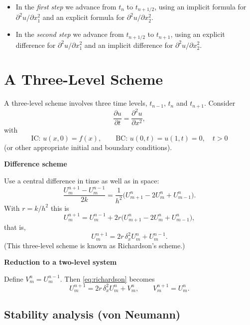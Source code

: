 \documentclass[11pt,a4paper]{article}
\numberwithin{equation}{section}
\theoremstyle{spacedplain}
\theoremstyle{spaceddefinition}
\theoremstyle{spacedremark}
\newcommand{\step}[1]{\par\addvspace{0.6em}\noindent\textbf{#1}\par\nobreak}
\newcommand{\pd}[2]{\frac{\partial #1}{\partial #2}}
\newcommand{\pdd}[2]{\frac{\partial^2 #1}{\partial #2^2}}
\begin{document}
\begin{itemize}
  \item In the \emph{first step} we advance from \(t_n\) to
    \(t_{n+1/2}\), using an implicit formula for
    \(\partial^2u/\partial x_1^2\) and an explicit formula for
    \(\partial^2u/\partial x_2^2\).
  \item In the \emph{second step} we advance from \(t_{n+1/2}\) to
    \(t_{n+1}\), using an explicit difference for
    \(\partial^2u/\partial x_1^2\) and an implicit difference for
    \(\partial^2u/\partial x_2^2\).
\end{itemize}

\section{A Three-Level Scheme}

A three-level scheme involves three time levels, \(t_{n-1}\), \(t_n\)
and \(t_{n+1}\).  Consider
\[
  \pd ut=\pdd ux,
\]
with
\[
  \text{IC: } u(x,0)=f(x),
  \qquad
  \text{BC: } u(0,t)=u(1,t)=0,\quad t>0
\]
(or other appropriate initial and boundary conditions).

\step{Difference scheme}
Use a central difference in time as well as in space:
\[
  \frac{U_m^{n+1}-U_m^{n-1}}{2k}
  =\frac1{h^2}\bigl(U_{m+1}^n-2U_m^n+U_{m-1}^n\bigr).
\]
With \(r=k/h^2\) this is
\[
  U_m^{n+1}=U_m^{n-1}+2r\bigl(U_{m+1}^n-2U_m^n+U_{m-1}^n\bigr),
\]
that is,
\begin{equation}\label{eq:richardson}
  U_m^{n+1}=2r\,\delta_x^2U_m^n+U_m^{n-1}.
\end{equation}
(This three-level scheme is known as Richardson's scheme.)

\step{Reduction to a two-level system}
Define \(V_m^n=U_m^{n-1}\).  Then \eqref{eq:richardson} becomes
\[
  U_m^{n+1}=2r\,\delta_x^2U_m^n+V_m^n,
  \qquad
  V_m^{n+1}=U_m^n .
\]

\subsection{Stability analysis (von Neumann)}
\end{document}
